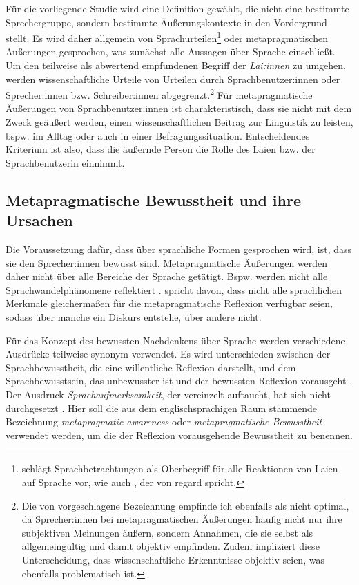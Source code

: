 Für die vorliegende Studie wird eine Definition gewählt, die nicht eine bestimmte Sprechergruppe, sondern bestimmte Äußerungskontexte in den Vordergrund stellt. 
Es wird daher allgemein von Sprachurteilen\footnote{\citet[31]{Cuonz.2014} schl{\"a}gt Sprachbetrachtungen als Oberbegriff f{\"u}r alle {\glqq}Reaktionen von Laien auf Sprache{\grqq} vor, wie auch \citet[4]{Preston2010b}, der von \glqq regard\grqq{} spricht.} oder metapragmatischen Äußerungen gesprochen, was zunächst alle Aussagen über Sprache einschließt.
Um den teilweise als abwertend empfundenen Begriff der \textit{Lai:innen} zu umgehen, werden wissenschaftliche Urteile von Urteilen durch Sprachbenutzer:innen oder Sprecher:innen bzw. {Schrei\-ber:in\-nen} abgegrenzt.\footnote{Die von \citet[15]{Konig.2014} vorgeschlagene Bezeichnung  empfinde ich ebenfalls als nicht optimal, da Sprecher:innen bei metapragmatischen Äußerungen häufig nicht nur ihre subjektiven Meinungen äußern, sondern Annahmen, die sie selbst als allgemeingültig und damit objektiv empfinden. Zudem impliziert diese Unterscheidung, dass wissenschaftliche Erkenntnisse objektiv seien, was ebenfalls problematisch ist.} 
Für metapragmatische Äußerungen von Sprachbenutzer:innen ist charakteristisch, dass sie nicht mit dem Zweck geäußert werden, einen wissenschaftlichen Beitrag zur Linguistik zu leisten, bspw. im Alltag oder auch in einer Befragungssituation. 
Entscheidendes Kriterium ist also, dass die äußernde Person die Rolle des Laien bzw. der Sprachbenutzerin einnimmt. 
\subsection{Metapragmatische Bewusstheit und ihre Ursachen}
\label{sec:MetapragmatischeBewusstheit}
Die Voraussetzung dafür, dass über sprachliche Formen gesprochen wird, ist, dass sie den Sprecher:innen bewusst sind. 
Metapragmatische Äußerungen werden daher nicht über alle Bereiche der Sprache getätigt. 
Bspw. werden nicht alle Sprachwandelphänomene reflektiert \citep[s.][233]{Labov1973}.
\citet[45]{Preston2004} spricht davon, dass nicht alle sprachlichen Merkmale gleichermaßen für die metapragmatische Reflexion verfügbar seien, sodass über manche ein Diskurs entstehe, über andere nicht. 

Für das Konzept des bewussten Nachdenkens über Sprache werden verschiedene Ausdrücke teilweise synonym verwendet. 
Es wird unterschieden zwischen der Sprachbewusstheit, die eine willentliche Reflexion darstellt, und dem Sprachbewusstsein, das unbewusster ist und der bewussten Reflexion vorausgeht \citep[s.][]{Spitta.2000}. 
Der Ausdruck \textit{Sprachaufmerksamkeit}, der vereinzelt auftaucht, hat sich nicht durchgesetzt \citep[s.][134]{Ossner2007}. 
Hier soll die aus dem englischsprachigen Raum stammende Bezeichnung \textit{metapragmatic awareness} oder \textit{metapragmatische Bewusstheit} verwendet werden, um die der Reflexion vorausgehende Bewusstheit zu benennen. 

